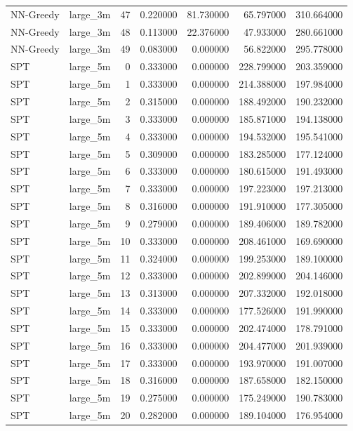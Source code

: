 \begin{tabular}{llrrrrr}
NN-Greedy & large_3m & 47 & 0.220000 & 81.730000 & 65.797000 & 310.664000 \\
NN-Greedy & large_3m & 48 & 0.113000 & 22.376000 & 47.933000 & 280.661000 \\
NN-Greedy & large_3m & 49 & 0.083000 & 0.000000 & 56.822000 & 295.778000 \\
SPT & large_5m & 0 & 0.333000 & 0.000000 & 228.799000 & 203.359000 \\
SPT & large_5m & 1 & 0.333000 & 0.000000 & 214.388000 & 197.984000 \\
SPT & large_5m & 2 & 0.315000 & 0.000000 & 188.492000 & 190.232000 \\
SPT & large_5m & 3 & 0.333000 & 0.000000 & 185.871000 & 194.138000 \\
SPT & large_5m & 4 & 0.333000 & 0.000000 & 194.532000 & 195.541000 \\
SPT & large_5m & 5 & 0.309000 & 0.000000 & 183.285000 & 177.124000 \\
SPT & large_5m & 6 & 0.333000 & 0.000000 & 180.615000 & 191.493000 \\
SPT & large_5m & 7 & 0.333000 & 0.000000 & 197.223000 & 197.213000 \\
SPT & large_5m & 8 & 0.316000 & 0.000000 & 191.910000 & 177.305000 \\
SPT & large_5m & 9 & 0.279000 & 0.000000 & 189.406000 & 189.782000 \\
SPT & large_5m & 10 & 0.333000 & 0.000000 & 208.461000 & 169.690000 \\
SPT & large_5m & 11 & 0.324000 & 0.000000 & 199.253000 & 189.100000 \\
SPT & large_5m & 12 & 0.333000 & 0.000000 & 202.899000 & 204.146000 \\
SPT & large_5m & 13 & 0.313000 & 0.000000 & 207.332000 & 192.018000 \\
SPT & large_5m & 14 & 0.333000 & 0.000000 & 177.526000 & 191.990000 \\
SPT & large_5m & 15 & 0.333000 & 0.000000 & 202.474000 & 178.791000 \\
SPT & large_5m & 16 & 0.333000 & 0.000000 & 204.477000 & 201.939000 \\
SPT & large_5m & 17 & 0.333000 & 0.000000 & 193.970000 & 191.007000 \\
SPT & large_5m & 18 & 0.316000 & 0.000000 & 187.658000 & 182.150000 \\
SPT & large_5m & 19 & 0.275000 & 0.000000 & 175.249000 & 190.783000 \\
SPT & large_5m & 20 & 0.282000 & 0.000000 & 189.104000 & 176.954000 \\

\end{tabular}
